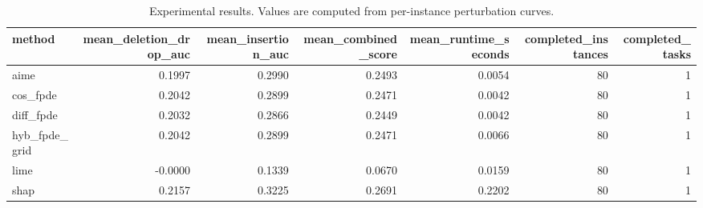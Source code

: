 \begin{table}[t]
\caption{Experimental results. Values are computed from per-instance perturbation curves.}
\label{tab:main_results_computed}
\centering
\begin{tabular}{lrrrrrr}
\toprule
method & mean\_deletion\_drop\_auc & mean\_insertion\_auc & mean\_combined\_score & mean\_runtime\_seconds & completed\_instances & completed\_tasks \\
\midrule
aime & 0.1997 & 0.2990 & 0.2493 & 0.0054 & 80 & 1 \\
cos\_fpde & 0.2042 & 0.2899 & 0.2471 & 0.0042 & 80 & 1 \\
diff\_fpde & 0.2032 & 0.2866 & 0.2449 & 0.0042 & 80 & 1 \\
hyb\_fpde\_grid & 0.2042 & 0.2899 & 0.2471 & 0.0066 & 80 & 1 \\
lime & -0.0000 & 0.1339 & 0.0670 & 0.0159 & 80 & 1 \\
shap & 0.2157 & 0.3225 & 0.2691 & 0.2202 & 80 & 1 \\
\bottomrule
\end{tabular}

\end{table}

